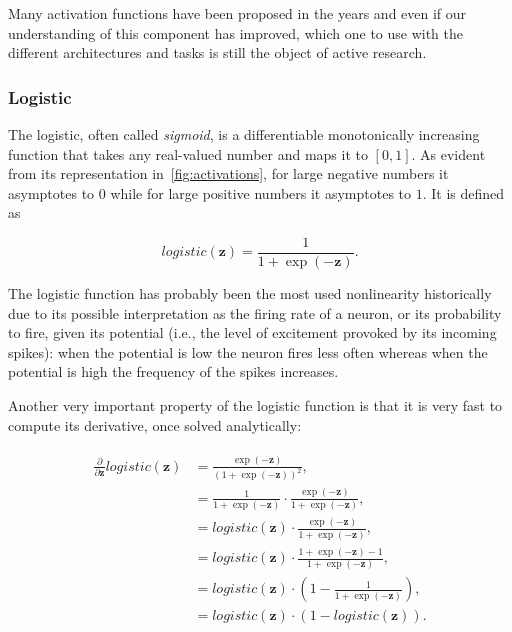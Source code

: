 Many activation functions have been proposed in the years and even if our
understanding of this component has improved, which one to use with the
different architectures and tasks is still the object of active research.

\subsubsection{Logistic}\label{sec:logistic}
The logistic, often called \emph{sigmoid}, is a differentiable monotonically
increasing function that takes any real-valued number and maps it to $[0, 1]$.
As evident from its representation in~\autoref{fig:activations}, for large
negative numbers it asymptotes to $0$ while for large positive numbers it
asymptotes to $1$. It is defined as

\begin{equation}\label{eq:logistic}
    logistic(\mathbf{z}) = \frac{1}{1+\exp(-\mathbf{z})}.
\end{equation}

\noindent The logistic function has probably been the most used nonlinearity
historically due to its possible interpretation as the firing rate of a neuron,
or its probability to fire, given its potential (i.e., the level of excitement
provoked by its incoming spikes): when the potential is low the neuron fires
less often whereas when the potential is high the frequency of the spikes
increases.

Another very important property of the logistic function is that it is very
fast to compute its derivative, once solved analytically:

\begin{align}\label{eq:logistic_derivative}
\begin{split}%
    \frac{\partial}{\partial \mathbf{z}}logistic(\mathbf{z}) &=
        \frac{\exp(\mathbf{-z})}{\left(1+\exp(-\mathbf{z})\right)^2} ,\\
    &= \frac{1}{1+\exp(-\mathbf{z})} \cdot
        \frac{\exp(-\mathbf{z})}{1+\exp(-\mathbf{z})} ,\\
    &= logistic(\mathbf{z}) \cdot
        \frac{\exp(-\mathbf{z})}{1+\exp(-\mathbf{z})} ,\\
    &= logistic(\mathbf{z}) \cdot
        \frac{1+\exp(-\mathbf{z})-1}{1+\exp(-\mathbf{z})} ,\\
    &= logistic(\mathbf{z}) \cdot
        \left(1-\frac{1}{1+\exp(-\mathbf{z})}\right) ,\\
    &= logistic(\mathbf{z}) \cdot (1-logistic(\mathbf{z})).
\end{split}
\end{align}

